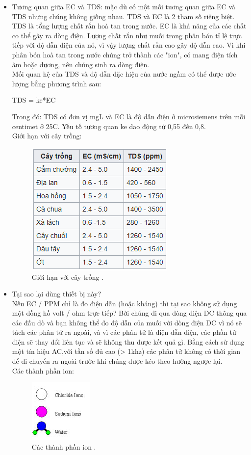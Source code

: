 \documentclass[a4paper,12pt,oneside]{article}
\begin{document}
\begin{itemize}
\item Tương quan giữa EC và TDS: mặc dù có một mối tuơng quan giữa EC và TDS nhưng chúng không giống nhau. TDS và EC là 2 tham số riêng biệt. TDS là tổng lượng chất rắn hoà tan trong nước. EC là khả năng của các chất co thể gây ra dòng điện. Lượng chất rắn như muối trong phân bón tỉ lệ trực tiếp với độ dẫn điện của nó, vì vậy lượng chất rắn cao gây độ dẫn cao. Vì khi phân bón hoà tan trong nước chúng trở thành các "ion", có mang điện tích âm hoặc dương, nên chúng sinh ra dòng điện.\\
Mối quan hệ của TDS và độ dẫn đặc hiệu của nước ngầm có thể được ước lượng bằng phương trình sau:
\begin{center}
		TDS = ke*EC
\end{center}					
Trong đó: TDS có đơn vị mg\/L và EC là độ dẫn điện ở microsiemens trên mỗi centimet ở 25\textdegree{}C. Yếu tố tương quan ke dao động từ 0,55 đến 0,8.\\
Giới hạn với cây trồng:
\begin{figure}[H]
	\centering
	\includegraphics[scale=.8]{hinh/PPM/ppm_thamkhao.PNG}
	\caption{Giới hạn với cây trồng \cite{ec}.}
	\label{fig:ppm_thamkhao}
\end{figure}

\item Tại sao lại dùng thiết bị này?\\
Nếu EC / PPM chỉ là đo điện dẫn (hoặc kháng) thì tại sao không sử dụng một đồng hồ volt / ohm trực tiếp? Bởi chúng đi qua dòng điện DC thông qua các đầu dò và bạn không thể đo độ dẫn của muối với dòng điện DC vì nó sẽ tách các phân tử ra ngoài, và vì các phân tử là điện dẫn điện, các phần tử điện sẽ thay đổi liên tục và sẽ không thu được kết quả gì. Bằng cách sử dụng một tín hiệu AC,với tần số đủ cao (> 1khz) các phân tử không có thời gian để di chuyển ra ngoài trước khi chúng được kéo theo hướng ngược lại.\\
Các thành phần ion:
\begin{figure}[H]
	\centering
	\includegraphics[scale=1]{hinh/PPM/ppm_ion.png}
	\caption{Các thành phần ion \cite{ppm}.}
	\label{fig:/ppm_ion}
\end{figure}


\end{itemize}
\end{document}
